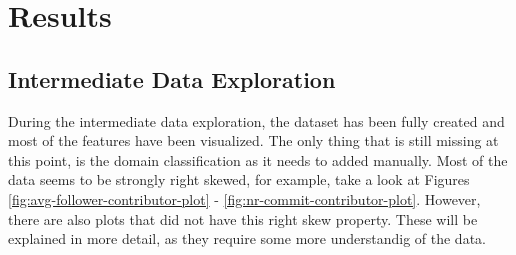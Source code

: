 \section{Results}
    \subsection{Intermediate Data Exploration}
        During the intermediate data exploration, the dataset has been fully created and most of the features have been visualized. 
        The only thing that is still missing at this point, is the domain classification as it needs to added manually.
        Most of the data seems to be strongly right skewed, for example, take a look at Figures \ref{fig:avg-follower-contributor-plot} - \ref{fig:nr-commit-contributor-plot}.
        However, there are also plots that did not have this right skew property.
        These will be explained in more detail, as they require some more understandig of the data.

